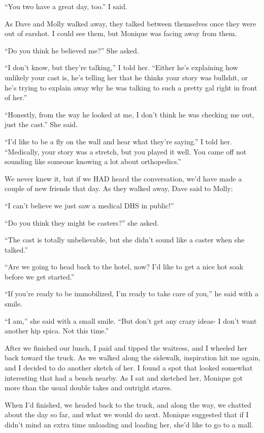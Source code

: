 ``You two have a great day, too.'' I said.

As Dave and Molly walked away, they talked between themselves once they were out of
earshot. I could see them, but Monique was facing away from them.

``Do you think he believed me?'' She asked.

``I don't know, but they're talking,'' I told her. ``Either he's explaining how unlikely your
cast is, he's telling her that he thinks your story was bullshit, or he's trying to explain away
why he was talking to such a pretty gal right in front of her.''

``Honestly, from the way he looked at me, I don't think he was checking me out, just the
cast.'' She said.

``I'd like to be a fly on the wall and hear what they're saying.'' I told her. ``Medically,
your story was a stretch, but you played it well. You came off not sounding like someone knowing
a lot about orthopedics.''

We never knew it, but if we HAD heard the conversation, we'd have made a couple of new
friends that day. As they walked away, Dave said to Molly:

``I can't believe we just saw a medical DHS in public!''

``Do you think they might be casters?'' she asked.

``The cast is totally unbelievable, but she didn't sound like a caster when she talked.''

``Are we going to head back to the hotel, now? I'd like to get a nice hot soak before we get
started.''

``If you're ready to be immobilized, I'm ready to take care of you,'' he said with a smile.

``I am,'' she said with a small smile. ``But don't get any crazy ideas- I don't want another
hip spica. Not this time.''

After we finished our lunch, I paid and tipped the waitress, and I wheeled her back toward
the truck. As we walked along the sidewalk, inspiration hit me again, and I decided to do
another sketch of her. I found a spot that looked somewhat interesting that had a bench nearby.
As I sat and sketched her, Monique got more than the usual double takes and outright stares.

When I'd finished, we headed back to the truck, and along the way, we chatted about the day
so far, and what we would do next. Monique suggested that if I didn't mind an extra time
unloading and loading her, she'd like to go to a mall.

